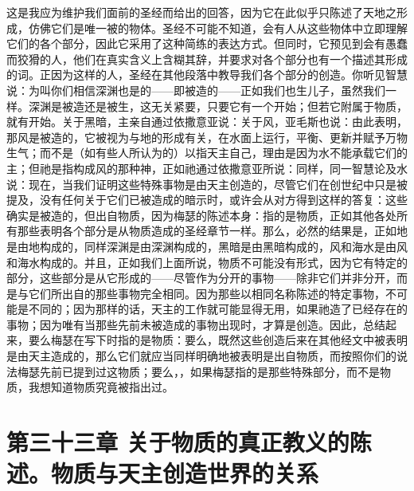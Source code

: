 这是我应为维护我们面前的圣经而给出的回答，因为它在此似乎只陈述了天地之形成，仿佛它们是唯一被的物体。圣经不可能不知道，会有人从这些物体中立即理解它们的各个部分，因此它采用了这种简练的表达方式。但同时，它预见到会有愚蠢而狡猾的人，他们在真实含义上含糊其辞，并要求对各个部分也有一个描述其形成的词。正因为这样的人，圣经在其他段落中教导我们各个部分的创造。你听见智慧说：为叫你们相信深渊也是的——即被造的——正如我们也生儿子，虽然我们一样。深渊是被造还是被生，这无关紧要，只要它有一个开始；但若它附属于物质，就有开始。关于黑暗，主亲自通过依撒意亚说：关于风，亚毛斯也说：由此表明，那风是被造的，它被视为与地的形成有关，在水面上运行，平衡、更新并赋予万物生气；而不是（如有些人所认为的）以指天主自己，理由是因为水不能承载它们的主；但祂是指构成风的那种神，正如祂通过依撒意亚所说：同样，同一智慧论及水说：现在，当我们证明这些特殊事物是由天主创造的，尽管它们在创世纪中只是被提及，没有任何关于它们已被造成的暗示时，或许会从对方得到这样的答复：这些确实是被造的，但出自物质，因为梅瑟的陈述本身：指的是物质，正如其他各处所有那些表明各个部分是从物质造成的圣经章节一样。那么，必然的结果是，正如地是由地构成的，同样深渊是由深渊构成的，黑暗是由黑暗构成的，风和海水是由风和海水构成的。并且，正如我们上面所说，物质不可能没有形式，因为它有特定的部分，这些部分是从它形成的——尽管作为分开的事物——除非它们并非分开，而是与它们所出自的那些事物完全相同。因为那些以相同名称陈述的特定事物，不可能是不同的；因为那样的话，天主的工作就可能显得无用，如果祂造了已经存在的事物；因为唯有当那些先前未被造成的事物出现时，才算是创造。因此，总结起来，要么梅瑟在写下时指的是物质：要么，既然这些创造后来在其他经文中被表明是由天主造成的，那么它们就应当同样明确地被表明是出自物质，而按照你们的说法梅瑟先前已提到过这物质；要么，，如果梅瑟指的是那些特殊部分，而不是物质，我想知道物质究竟被指出过。\par


\section{第三十三章 关于物质的真正教义的陈述。物质与天主创造世界的关系}

